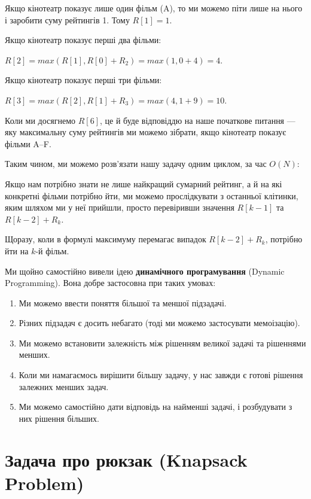 \documentclass[12pt,a4paper]{report}
\begin{document}
Якщо кінотеатр показує лише один фільм (A), то ми можемо піти лише на нього і заробити суму рейтингів 1. Тому \(R[1] = 1\).

Якщо кінотеатр показує перші два фільми:

\(R[2] = max(R[1], R[0] + R_2) = max(1, 0 + 4) = 4\).

Якщо кінотеатр показує перші три фільми:

\(R[3] = max(R[2], R[1] + R_3) = max(4, 1 + 9) = 10\).

Коли ми досягнемо \(R[6]\), це й буде відповіддю на наше початкове питання --- яку максимальну суму рейтингів ми можемо зібрати, якщо кінотеатр показує фільми A--F.

Таким чином, ми можемо розв’язати нашу задачу одним циклом, за час \(O(N)\):



Якщо нам потрібно знати не лише найкращий сумарний рейтинг, а й на які конкретні фільми потрібно йти, ми можемо прослідкувати з останньої клітинки, яким шляхом ми у неї прийшли, просто перевіривши значення \(R[k - 1]\) та \(R[k - 2] + R_k\).

Щоразу, коли в формулі максимуму перемагає випадок \(R[k - 2] + R_k\), потрібно йти на \(k\)-й фільм.



Ми щойно самостійно вивели ідею \textbf{динамічного програмування} (Dynamic Programming). Вона добре застосовна при таких умовах:

\begin{enumerate}
    \item Ми можемо ввести поняття більшої та меншої підзадачі.
    \item Різних підзадач є досить небагато (тоді ми можемо застосувати мемоізацію).
    \item Ми можемо встановити залежність між рішенням великої задачі та рішеннями менших.
    \item Коли ми намагаємось вирішити більшу задачу, у нас завжди є готові рішення залежних менших задач.
    \item Ми можемо самостійно дати відповідь на найменші задачі, і розбудувати з них рішення більших.
\end{enumerate}



\section{Задача про рюкзак (Knapsack Problem)}
\end{document}
